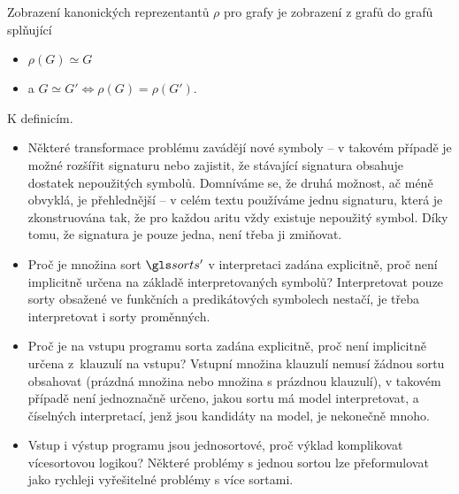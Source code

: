 Zobrazení kanonických reprezentantů $\rho$ pro grafy
je zobrazení z grafů do grafů splňující
\begin{itemize}
\item $\rho(G) \simeq G$
\item a $G \simeq G' \iff \rho(G) = \rho(G')$.
\end{itemize}


\begin{note}
K definicím.
\begin{itemize}
\item Některé transformace problému zavádějí nové symboly --
  v takovém případě je možné rozšířit signaturu nebo zajistit,
  že stávající signatura obsahuje dostatek nepoužitých symbolů. Domníváme se,
  že druhá možnost, ač méně obvyklá, je přehlednější --
  v celém textu používáme jednu signaturu, která je
  zkonstruována tak, že pro každou aritu vždy existuje
  nepoužitý symbol. Díky tomu, že signatura je pouze jedna,
  není třeba ji zmiňovat.
\item Proč je množina sort $\sorts'$ v interpretaci zadána explicitně, proč
  není implicitně určena na základě interpretovaných symbolů?
  Interpretovat pouze sorty obsažené ve funkčních a predikátových
  symbolech nestačí, je třeba interpretovat i sorty proměnných.
\item Proč je na vstupu programu sorta zadána explicitně,
  proč není implicitně určena
  z~klauzulí na vstupu? Vstupní množina klauzulí nemusí žádnou sortu
  obsahovat (prázdná množina nebo množina s prázdnou klauzulí), v takovém
  případě není
  jednoznačně určeno, jakou sortu má model interpretovat, a číselných
  interpretací, jenž jsou kandidáty na model, je nekonečně mnoho.
\item Vstup i výstup programu jsou jednosortové, proč výklad komplikovat
  více\-sor\-tovou logikou? Některé problémy s jednou sortou
  lze přeformulovat jako rychleji vyřešitelné problémy s více sortami.
\end{itemize}
\end{note}
